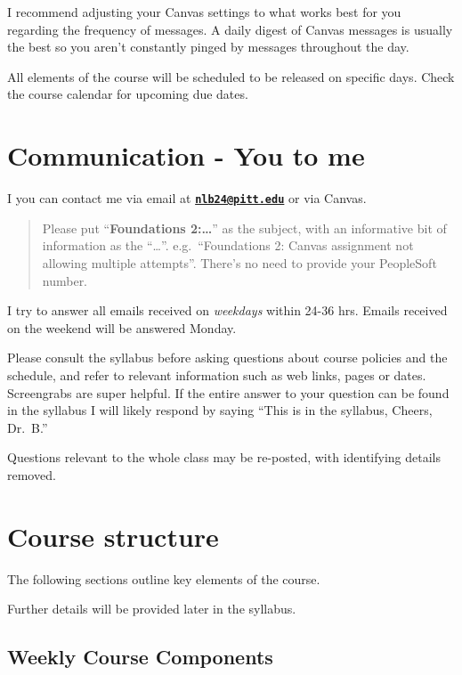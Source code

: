 \documentclass[
]{book}
\begin{document}
I recommend adjusting your Canvas settings to what works best for you regarding the frequency of messages. A daily digest of Canvas messages is usually the best so you aren't constantly pinged by messages throughout the day.

All elements of the course will be scheduled to be released on specific days. Check the course calendar for upcoming due dates.

\hypertarget{communication-u2me}{%
\chapter{Communication - You to me}\label{communication-u2me}}

I you can contact me via email at \textbf{\href{mailto:nlb24@pitt.edu}{\nolinkurl{nlb24@pitt.edu}}} or via Canvas.

\begin{quote}
Please put ``\textbf{Foundations 2:\ldots{}}'' as the subject, with an informative bit of information as the ``\ldots{}''. e.g.~``Foundations 2: Canvas assignment not allowing multiple attempts''. There's no need to provide your PeopleSoft number.
\end{quote}

I try to answer all emails received on \emph{weekdays} within 24-36 hrs. Emails received on the weekend will be answered Monday.

Please consult the syllabus before asking questions about course policies and the schedule, and refer to relevant information such as web links, pages or dates. Screengrabs are super helpful. If the entire answer to your question can be found in the syllabus I will likely respond by saying ``This is in the syllabus, Cheers, Dr.~B.''

Questions relevant to the whole class may be re-posted, with identifying details removed.

\hypertarget{course-structure}{%
\chapter{Course structure}\label{course-structure}}

The following sections outline key elements of the course.

Further details will be provided later in the syllabus.

\hypertarget{weekly-course-components}{%
\section{Weekly Course Components}\label{weekly-course-components}}
\end{document}
